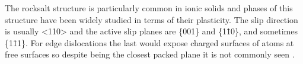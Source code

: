 The rocksalt structure is particularly common in ionic solids and phases of this structure have been widely studied in terms of their plasticity. The slip direction is usually <110> and the active slip planes are \{001\} and \{1\={1}0\}, and sometimes \{1\={1}1\}. For edge dislocations the last would expose charged surfaces of atoms at free surfaces so despite being the closest packed plane it is not commonly seen \cite{Haasen1985}.



























































